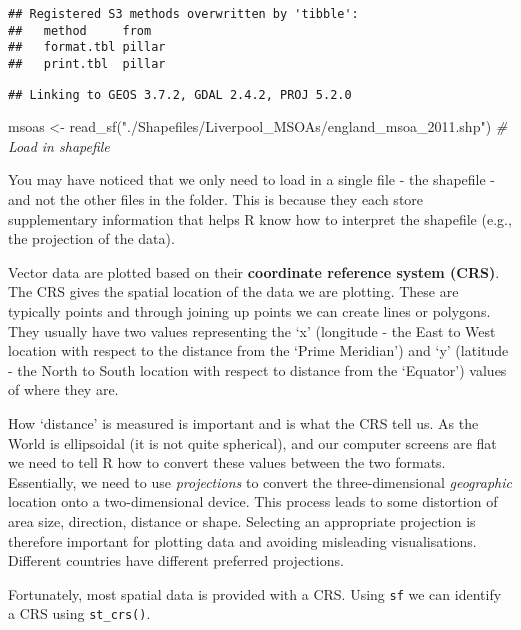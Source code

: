 \documentclass[
]{book}
\newenvironment{Shaded}{\begin{snugshade}}{\end{snugshade}}
\newcommand{\CommentTok}[1]{\textcolor[rgb]{0.56,0.35,0.01}{\textit{#1}}}
\newcommand{\FunctionTok}[1]{\textcolor[rgb]{0.00,0.00,0.00}{#1}}
\newcommand{\NormalTok}[1]{#1}
\newcommand{\OtherTok}[1]{\textcolor[rgb]{0.56,0.35,0.01}{#1}}
\newcommand{\StringTok}[1]{\textcolor[rgb]{0.31,0.60,0.02}{#1}}
\begin{document}
\begin{verbatim}
## Registered S3 methods overwritten by 'tibble':
##   method     from  
##   format.tbl pillar
##   print.tbl  pillar
\end{verbatim}

\begin{verbatim}
## Linking to GEOS 3.7.2, GDAL 2.4.2, PROJ 5.2.0
\end{verbatim}

\begin{Shaded}
\begin{Highlighting}[]
\NormalTok{msoas }\OtherTok{\textless{}{-}} \FunctionTok{read\_sf}\NormalTok{(}\StringTok{"./Shapefiles/Liverpool\_MSOAs/england\_msoa\_2011.shp"}\NormalTok{)  }\CommentTok{\# Load in shapefile}
\end{Highlighting}
\end{Shaded}

You may have noticed that we only need to load in a single file - the shapefile - and not the other files in the folder. This is because they each store supplementary information that helps R know how to interpret the shapefile (e.g., the projection of the data).

Vector data are plotted based on their \textbf{coordinate reference system (CRS)}. The CRS gives the spatial location of the data we are plotting. These are typically points and through joining up points we can create lines or polygons. They usually have two values representing the `x' (longitude - the East to West location with respect to the distance from the `Prime Meridian') and `y' (latitude - the North to South location with respect to distance from the `Equator') values of where they are.

How `distance' is measured is important and is what the CRS tell us. As the World is ellipsoidal (it is not quite spherical), and our computer screens are flat we need to tell R how to convert these values between the two formats. Essentially, we need to use \emph{projections} to convert the three-dimensional \emph{geographic} location onto a two-dimensional device. This process leads to some distortion of area size, direction, distance or shape. Selecting an appropriate projection is therefore important for plotting data and avoiding misleading visualisations. Different countries have different preferred projections.

Fortunately, most spatial data is provided with a CRS. Using \texttt{sf} we can identify a CRS using \texttt{st\_crs()}.
\end{document}
